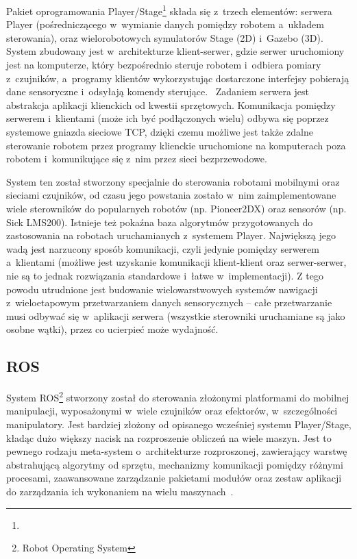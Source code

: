 Pakiet oprogramowania Player/Stage\footnote{}
składa się z~trzech elementów: serwera Player (pośredniczącego w~wymianie danych
pomiędzy robotem a~układem sterowania), oraz wielorobotowych symulatorów Stage (2D)
i~Gazebo (3D). System zbudowany jest w~architekturze klient-serwer, gdzie serwer
uruchomiony jest na komputerze, który bezpośrednio steruje robotem i~odbiera
pomiary z~czujników, a~programy klientów wykorzystując dostarczone interfejsy
pobierają dane sensoryczne i~odsyłają komendy sterujące.~\cite{gerkey03playerstage}
Zadaniem serwera jest abstrakcja aplikacji klienckich od kwestii sprzętowych.
Komunikacja pomiędzy serwerem i~klientami (może ich być podłączonych wielu)
odbywa się poprzez systemowe gniazda sieciowe TCP, dzięki czemu możliwe jest także
zdalne sterowanie robotem przez programy klienckie uruchomione na komputerach poza
robotem i~komunikujące się z~nim przez sieci bezprzewodowe.

System ten został stworzony specjalnie do sterowania robotami mobilnymi oraz sieciami
czujników, od czasu jego powstania zostało w~nim zaimplementowane wiele sterowników
do popularnych robotów (np. Pioneer2DX) oraz sensorów (np. Sick LMS200). Istnieje
też pokaźna baza algorytmów przygotowanych do zastosowania na robotach uruchamianych
z~systemem Player. Największą jego wadą jest narzucony sposób komunikacji, czyli
jedynie pomiędzy serwerem a~klientami (możliwe jest uzyskanie komunikacji klient-klient
oraz serwer-serwer, nie są to jednak rozwiązania standardowe i~łatwe w~implementacji).
Z tego powodu utrudnione jest budowanie wielowarstwowych systemów nawigacji z~wieloetapowym
przetwarzaniem danych sensorycznych -- całe przetwarzanie musi odbywać się w~aplikacji
serwera (wszystkie sterowniki uruchamiane są jako osobne wątki), przez co ucierpieć
może wydajność.

\subsection{ROS}

System ROS\footnote{Robot Operating System} stworzony został
do sterowania złożonymi platformami do mobilnej manipulacji, wyposażonymi w~wiele
czujników oraz efektorów, w~szczególności manipulatory. Jest bardziej złożony od
opisanego wcześniej systemu Player/Stage, kładąc dużo większy nacisk na rozproszenie
obliczeń na wiele maszyn. Jest to pewnego rodzaju meta-system o~architekturze rozproszonej,
zawierający warstwę abstrahującą algorytmy od sprzętu, mechanizmy komunikacji
pomiędzy różnymi procesami, zaawansowane zarządzanie pakietami modułów oraz zestaw
aplikacji do zarządzania ich wykonaniem na wielu maszynach~\cite{288}.

